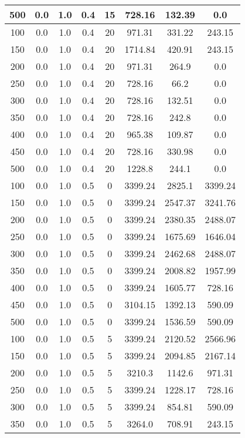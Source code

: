 \documentclass[a4paper, 12pt]{extreport}
\begin{document}
\begin{itemize}
\begin{longtable}{|c|c|c|c|c|c|c|c|}
			500 & 0.0 & 1.0 & 0.4 & 15 & 728.16 & 132.39 & 0.0 \\\hline
			100 & 0.0 & 1.0 & 0.4 & 20 & 971.31 & 331.22 & 243.15 \\\hline
			150 & 0.0 & 1.0 & 0.4 & 20 & 1714.84 & 420.91 & 243.15 \\\hline
			200 & 0.0 & 1.0 & 0.4 & 20 & 971.31 & 264.9 & 0.0 \\\hline
			250 & 0.0 & 1.0 & 0.4 & 20 & 728.16 & 66.2 & 0.0 \\\hline
			300 & 0.0 & 1.0 & 0.4 & 20 & 728.16 & 132.51 & 0.0 \\\hline
			350 & 0.0 & 1.0 & 0.4 & 20 & 728.16 & 242.8 & 0.0 \\\hline
			400 & 0.0 & 1.0 & 0.4 & 20 & 965.38 & 109.87 & 0.0 \\\hline
			450 & 0.0 & 1.0 & 0.4 & 20 & 728.16 & 330.98 & 0.0 \\\hline
			500 & 0.0 & 1.0 & 0.4 & 20 & 1228.8 & 244.1 & 0.0 \\\hline
			100 & 0.0 & 1.0 & 0.5 & 0 & 3399.24 & 2825.1 & 3399.24 \\\hline
			150 & 0.0 & 1.0 & 0.5 & 0 & 3399.24 & 2547.37 & 3241.76 \\\hline
			200 & 0.0 & 1.0 & 0.5 & 0 & 3399.24 & 2380.35 & 2488.07 \\\hline
			250 & 0.0 & 1.0 & 0.5 & 0 & 3399.24 & 1675.69 & 1646.04 \\\hline
			300 & 0.0 & 1.0 & 0.5 & 0 & 3399.24 & 2462.68 & 2488.07 \\\hline
			350 & 0.0 & 1.0 & 0.5 & 0 & 3399.24 & 2008.82 & 1957.99 \\\hline
			400 & 0.0 & 1.0 & 0.5 & 0 & 3399.24 & 1605.77 & 728.16 \\\hline
			450 & 0.0 & 1.0 & 0.5 & 0 & 3104.15 & 1392.13 & 590.09 \\\hline
			500 & 0.0 & 1.0 & 0.5 & 0 & 3399.24 & 1536.59 & 590.09 \\\hline
			100 & 0.0 & 1.0 & 0.5 & 5 & 3399.24 & 2120.52 & 2566.96 \\\hline
			150 & 0.0 & 1.0 & 0.5 & 5 & 3399.24 & 2094.85 & 2167.14 \\\hline
			200 & 0.0 & 1.0 & 0.5 & 5 & 3210.3 & 1142.6 & 971.31 \\\hline
			250 & 0.0 & 1.0 & 0.5 & 5 & 3399.24 & 1228.17 & 728.16 \\\hline
			300 & 0.0 & 1.0 & 0.5 & 5 & 3399.24 & 854.81 & 590.09 \\\hline
			350 & 0.0 & 1.0 & 0.5 & 5 & 3264.0 & 708.91 & 243.15 \\\hline

\end{longtable}
\end{itemize}
\end{document}
